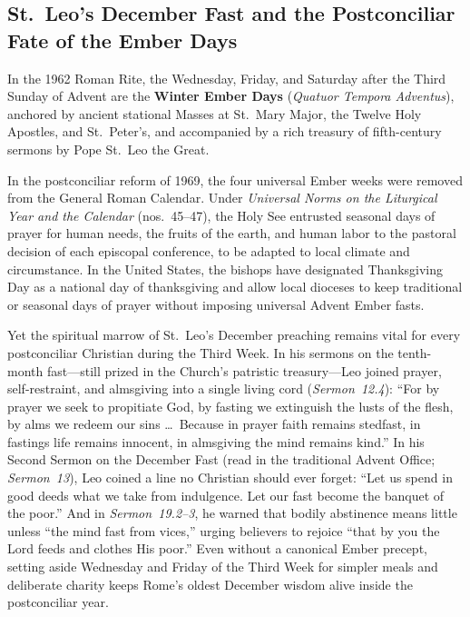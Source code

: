 \subsection{St.~Leo's December Fast and the Postconciliar Fate of the Ember Days}

In the 1962 Roman Rite, the Wednesday, Friday, and Saturday after the Third Sunday of Advent are the \textbf{Winter Ember Days} (\textit{Quatuor Tempora Adventus}), anchored by ancient stational Masses at St.~Mary Major, the Twelve Holy Apostles, and St.~Peter's, and accompanied by a rich treasury of fifth-century sermons by Pope St.~Leo the Great.

In the postconciliar reform of 1969, the four universal Ember weeks were removed from the General Roman Calendar. Under \textit{Universal Norms on the Liturgical Year and the Calendar} (nos.~45--47), the Holy See entrusted seasonal days of prayer for human needs, the fruits of the earth, and human labor to the pastoral decision of each episcopal conference, to be adapted to local climate and circumstance. In the United States, the bishops have designated Thanksgiving Day as a national day of thanksgiving and allow local dioceses to keep traditional or seasonal days of prayer without imposing universal Advent Ember fasts.

Yet the spiritual marrow of St.~Leo's December preaching remains vital for every postconciliar Christian during the Third Week. In his sermons on the tenth-month fast---still prized in the Church's patristic treasury---Leo joined prayer, self-restraint, and almsgiving into a single living cord (\textit{Sermon~12.4}): ``For by prayer we seek to propitiate God, by fasting we extinguish the lusts of the flesh, by alms we redeem our sins \dots\ Because in prayer faith remains stedfast, in fastings life remains innocent, in almsgiving the mind remains kind.'' In his Second Sermon on the December Fast (read in the traditional Advent Office; \textit{Sermon~13}), Leo coined a line no Christian should ever forget: ``Let us spend in good deeds what we take from indulgence. Let our fast become the banquet of the poor.'' And in \textit{Sermon~19.2--3}, he warned that bodily abstinence means little unless ``the mind fast from vices,'' urging believers to rejoice ``that by you the Lord feeds and clothes His poor.'' Even without a canonical Ember precept, setting aside Wednesday and Friday of the Third Week for simpler meals and deliberate charity keeps Rome's oldest December wisdom alive inside the postconciliar year.

